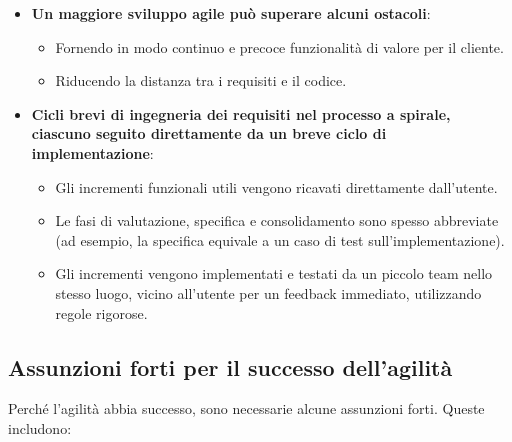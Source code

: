 \begin{itemize}
    \item \textbf{Un maggiore sviluppo agile può superare alcuni ostacoli}:
    \begin{itemize}
        \item Fornendo in modo continuo e precoce funzionalità di valore per
        il cliente.
        \item Riducendo la distanza tra i requisiti e il codice.
    \end{itemize}
    
    \item \textbf{Cicli brevi di ingegneria dei requisiti nel processo a spirale,
    ciascuno seguito direttamente da un breve ciclo di implementazione}:
    \begin{itemize}
        \item Gli incrementi funzionali utili vengono ricavati direttamente
        dall'utente.
        \item Le fasi di valutazione, specifica e consolidamento sono spesso
        abbreviate (ad esempio, la specifica equivale a un caso di test
        sull'implementazione).
        \item Gli incrementi vengono implementati e testati da un piccolo
        team nello stesso luogo, vicino all'utente per un feedback immediato,
        utilizzando regole rigorose.
    \end{itemize}
\end{itemize}
\subsection{Assunzioni forti per il successo dell'agilità}

Perché l'agilità abbia successo, sono necessarie alcune assunzioni forti.
Queste includono:

